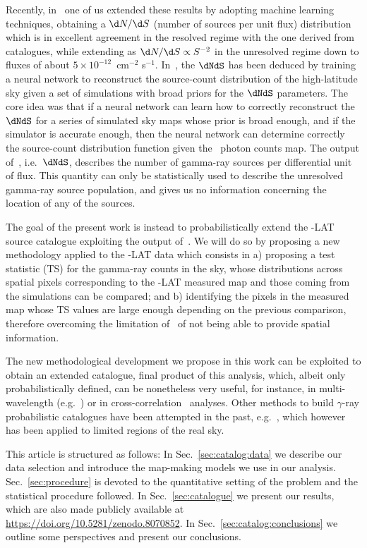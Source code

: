 Recently, in~\cite{Amerio:2023uet} one of us extended these results by adopting machine learning techniques,  obtaining  a $\d N/\d S$ (number of sources per unit flux) distribution which  is in excellent agreement in the resolved regime with the one derived from catalogues, while extending as $\d N/\d S\propto S^{-2}$ in the unresolved regime down to fluxes of about $5\times 10^{-12}\,$ cm$^{-2}$ s$^{-1}$. 
%
In~\cite{Amerio:2023uet}, the $\dNdS$ has been deduced by training a neural network to reconstruct the source-count distribution of the high-latitude sky given a set of simulations with broad priors for the $\dNdS$ parameters. The core idea was that if a neural network can learn how to correctly reconstruct the $\dNdS$ for a series of simulated sky maps whose prior is broad enough, and if the simulator is accurate enough, then the neural network can determine correctly the source-count distribution function given the \Fermi~photon counts map. 
%
The output of~\cite{Amerio:2023uet}, i.e.~$\dNdS$, describes the number of gamma-ray sources per differential unit of flux. This quantity can only be statistically used to describe the unresolved gamma-ray source population, and gives us no information concerning the location of any of the sources.

The goal of the present work is instead to probabilistically extend the \Fermi-LAT source catalogue exploiting the output of~\cite{Amerio:2023uet}. We will do so by proposing a new methodology applied to the \Fermi-LAT data which consists in a) proposing a test statistic (TS) for the gamma-ray counts in the sky, whose distributions across spatial pixels corresponding to the \Fermi-LAT measured map and those coming from the simulations can be compared; and b) identifying the pixels in the measured map whose TS values are large enough depending on the previous comparison, therefore overcoming the limitation of~\cite{Amerio:2023uet} of not being able to provide spatial information.

The new methodological development we propose in this work can be exploited to obtain an extended catalogue, final product of this analysis, which, albeit only probabilistically defined, can be nonetheless very useful, for instance, in multi-wavelength (e.g.~\cite{2015ApJS..217....2M,Pena-Herazo:2021yrp,Pena-Herazo:2021ybj}) or in cross-correlation~\cite{2009ApJ...707L..56K,2010MNRAS.407..791G,Turley:2018biv,Li:2022vsb} analyses.   
%
Other methods to build $\gamma$-ray probabilistic catalogues have been attempted in the past, e.g.~\cite{Daylan:2016tia}, which however has been applied to limited regions of the real sky.


This article is structured as follows: In Sec.~\ref{sec:catalog:data} we describe our data selection and introduce the map-making models we  use in our analysis.  Sec.~\ref {sec:procedure} is devoted to the quantitative setting of the problem and the statistical procedure followed. In Sec.~\ref{sec:catalogue} we present our results, which are also  made publicly available at \href{https://doi.org/10.5281/zenodo.8070852}{https://doi.org/10.5281/zenodo.8070852}. In Sec.~\ref{sec:catalog:conclusions} we outline some perspectives and present our conclusions.  


